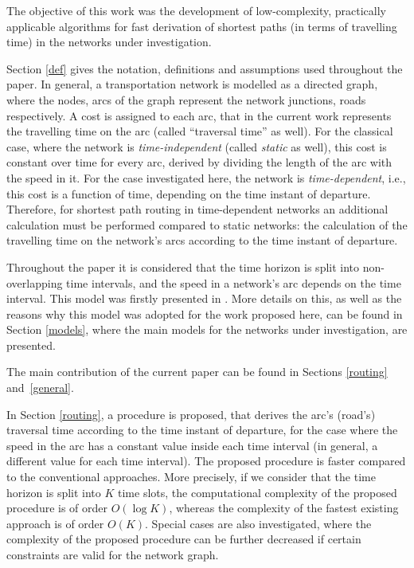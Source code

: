 \documentclass[conference]{IEEEtran}
\begin{document}
The objective of this work was the development of low-complexity, practically applicable algorithms for fast derivation of shortest paths (in terms of travelling time) in the networks under investigation.      

Section \ref{def} gives the notation, definitions and assumptions used throughout the paper. In general, a transportation network is modelled as a directed graph, where the nodes, arcs of the graph represent the network junctions, roads respectively. A cost is assigned to each arc, that in the current work represents the travelling time on the arc (called ``traversal time'' as well). For the classical case, where the network is \emph{time-independent} (called \emph{static} as well), this cost is constant over time for every arc, derived by dividing the length of the arc with the speed in it.  For the case investigated here, the network is \emph{time-dependent}, i.e., this cost is a function of time, depending on the time instant of departure. Therefore, for shortest path routing in time-dependent networks an additional calculation must be performed compared to static networks: the calculation of the travelling time on the network's arcs according to the time instant of departure. 

Throughout the paper it is considered that the time horizon is split into non-overlapping time intervals, and the speed in a network's arc depends on the time interval. This model was firstly presented in \cite{Sung}. More details on this, as well as the reasons why this model was adopted for the work proposed here, can be found in Section \ref{models}, where the main models for the networks under investigation, are presented.  

The main contribution of the current paper can be found in Sections \ref{routing} and~\ref{general}. 

In Section \ref{routing}, a procedure is proposed, that derives the arc's (road's) traversal time according to the time instant of departure, for the case where the speed in the arc has a constant value inside each time interval (in general, a different value for each time interval). The proposed procedure is faster compared to the conventional approaches. More precisely, if we consider that the time horizon is split into $K$ time slots, the computational complexity of the proposed procedure is of order $O(\log K)$, whereas the complexity of the fastest existing approach is of order $O(K)$. Special cases are also investigated, where the complexity of the proposed procedure can be further decreased if certain constraints are valid for the network graph. 
\end{document}
